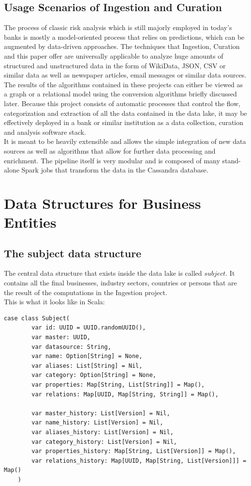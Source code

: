 \documentclass[
  a4paper,     %
  titlepage,   %
  oneside,     %
  parskip      %
]{scrartcl}          %
\begin{document}
    \subsection{Usage Scenarios of Ingestion and Curation}
    The process of classic risk analysis which is still majorly employed in today's banks is mostly
    a model-oriented process that relies on predictions, which can be augmented by data-driven approaches.
    The techniques that Ingestion, Curation and this paper offer are universally
    applicable to analyze huge amounts of structured and unstructured data
    in the form of WikiData, JSON, CSV or similar data as well as newspaper articles,
    email messages or similar data sources.\\
    The results of the algorithms contained in these projects can either be viewed as a graph or a relational model
    using the conversion algorithms briefly discussed later.
    Because this project consists of automatic processes
    that control the flow, categorization and extraction
    of all the data contained in the data lake, it may be effectively deployed in a bank
    or similar institution as a data collection, curation and analysis software stack.\\
    It is meant to be heavily extensible and allows the simple integration of new data sources %
    as well as algorithms that allow for further data processing and enrichment.
    The pipeline itself is very modular and is composed of many stand-alone
    Spark jobs that transform the data in the Cassandra database.

  \section{Data Structures for Business Entities}
    \subsection{The subject data structure}
    \label{sec:subject_structure}
    The central data structure that exists inside the data lake is called $subject$.
    It contains all the final businesses, industry sectors, countries or persons
    that are the result of the computations in the Ingestion project.\\

    This is what it looks like in Scala:
    \begin{lstlisting}[style=scalaStyle,caption=Subject]
    case class Subject(
    	var id: UUID = UUID.randomUUID(),
    	var master: UUID,
    	var datasource: String,
    	var name: Option[String] = None,
    	var aliases: List[String] = Nil,
    	var category: Option[String] = None,
    	var properties: Map[String, List[String]] = Map(),
    	var relations: Map[UUID, Map[String, String]] = Map(),

    	var master_history: List[Version] = Nil,
    	var name_history: List[Version] = Nil,
    	var aliases_history: List[Version] = Nil,
    	var category_history: List[Version] = Nil,
    	var properties_history: Map[String, List[Version]] = Map(),
    	var relations_history: Map[UUID, Map[String, List[Version]]] = Map()
    )
    \end{lstlisting}
\end{document}

